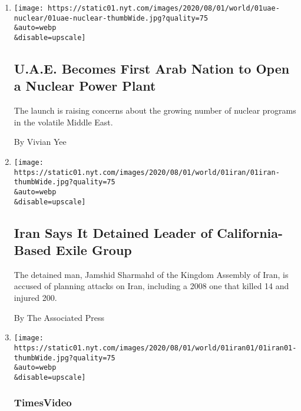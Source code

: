 \begin{enumerate}
\def\labelenumi{\arabic{enumi}.}
\item
  \href{/2020/08/01/world/middleeast/uae-nuclear-Barakah.html}{}

  \texttt{[image: https://static01.nyt.com/images/2020/08/01/world/01uae-nuclear/01uae-nuclear-thumbWide.jpg?quality=75\\\&auto=webp\\\&disable=upscale]}

  \hypertarget{uae-becomes-first-arab-nation-to-open-a-nuclear-power-plant}{%
  \subsection{U.A.E. Becomes First Arab Nation to Open a Nuclear Power
  Plant}\label{uae-becomes-first-arab-nation-to-open-a-nuclear-power-plant}}

  The launch is raising concerns about the growing number of nuclear
  programs in the volatile Middle East.

  By Vivian Yee
\item
  \href{/2020/08/01/world/middleeast/iran-jamshid-sharmahd-arrested-kingdom-assembly.html}{}

  \texttt{[image: https://static01.nyt.com/images/2020/08/01/world/01iran/01iran-thumbWide.jpg?quality=75\\\&auto=webp\\\&disable=upscale]}

  \hypertarget{iran-says-it-detained-leader-of-california-based-exile-group}{%
  \subsection{Iran Says It Detained Leader of California-Based Exile
  Group}\label{iran-says-it-detained-leader-of-california-based-exile-group}}

  The detained man, Jamshid Sharmahd of the Kingdom Assembly of Iran, is
  accused of planning attacks on Iran, including a 2008 one that killed
  14 and injured 200.

  By The Associated Press
\item
  \href{/video/world/middleeast/100000007268443/iran-united-states-nuclear-program-negotiation.html}{}

  \texttt{[image: https://static01.nyt.com/images/2020/08/01/world/01iran01/01iran01-thumbWide.jpg?quality=75\\\&auto=webp\\\&disable=upscale]}

  \hypertarget{timesvideo}{%
  \subsubsection{TimesVideo}\label{timesvideo}}


\end{enumerate}
